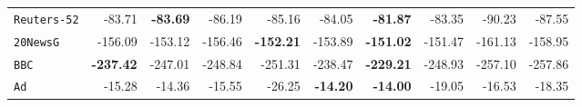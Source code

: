 \documentclass[xcolor={usenames,dvipsnames,svgnames}, compress]{beamer}
\begin{document}
\begin{frame}[t]
\begin{table}[t]
\begin{tabular}{l r r r r  r  r r r r}
    \texttt{Reuters-52} & -83.71                               & \textbf{-83.69}                                & -86.19                 & -85.16  & -84.05  & \textbf{-81.87}  & -83.35         & -90.23          & -87.55          \\ 
    \texttt{20NewsG}    & -156.09                              & -153.12                               & -156.46                & \textbf{-152.21} & -153.89 & \textbf{-151.02} & -151.47        & -161.13         & -158.95         \\ 
    \texttt{BBC}        & \textbf{-237.42}                              & -247.01                               & -248.84                & -251.31 & -238.47 & \textbf{-229.21} & -248.93        & -257.10         & -257.86         \\ 
    \texttt{Ad}         & -15.28                               & -14.36                                & -15.55                 & -26.25  & \textbf{-14.20}  & \textbf{-14.00}  & -19.05         & -16.53          & -18.35          \\ 
    \bottomrule
  \end{tabular}
  \label{tab:ll-ens}
\end{table}
\hspace{50pt}%
\end{frame}
\end{document}

